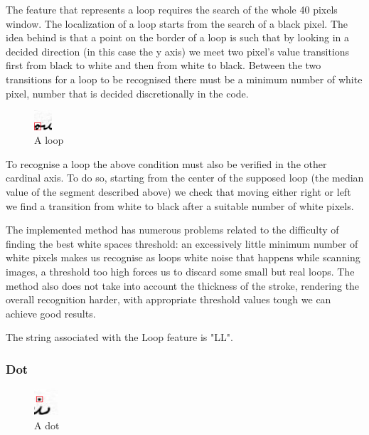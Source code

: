 The feature that represents a loop requires the search of the whole 40 pixels window.
The localization of a loop starts from the search of a black pixel. The idea behind is that a point on the border of a loop is such that by looking in a decided direction (in this case the y axis) we meet two pixel's value transitions first from black to white and then from white to black. Between the two transitions for a loop to be recognised there must be a minimum number of white pixel, number that is decided discretionally in the code.

\begin{figure}
  \vspace{-20pt}
  \begin{center}
    \includegraphics[width=0.06\textwidth]{images/loop.jpg}
  \end{center}
  \vspace{-20pt}
  \caption{A loop}
  \vspace{-10pt}
\end{figure}

To recognise a loop the above condition must also be verified in the other cardinal axis. To do so, starting from the center of the supposed loop (the median value of the segment described above) we check that moving either right or left we find a transition from white to black after a suitable number of white pixels.

The implemented method has numerous problems related to the difficulty of finding the best white spaces threshold: an excessively little minimum number of white pixels makes us recognise as loops white noise that happens while scanning images, a threshold too high forces us to discard some small but real loops. The method also does not take into account the thickness of the stroke, rendering the overall recognition harder, with appropriate threshold values tough we can achieve good results.

The string associated with the Loop feature is "LL".
\subsubsection{Dot}

\begin{figure}
  \vspace{-20pt}
  \begin{center}
    \includegraphics[width=0.08\textwidth]{images/dot}
  \end{center}
  \vspace{-20pt}
  \caption{A dot}
  \vspace{-10pt}
\end{figure}

